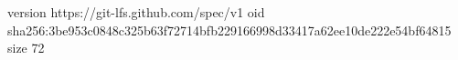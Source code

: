 version https://git-lfs.github.com/spec/v1
oid sha256:3be953c0848c325b63f72714bfb229166998d33417a62ee10de222e54bf64815
size 72
